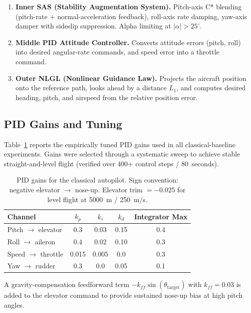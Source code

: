 \documentclass{article}
\begin{document}
\begin{enumerate}
  \item \textbf{Inner SAS (Stability Augmentation System).}
        Pitch-axis C* blending (pitch-rate + normal-acceleration feedback),
        roll-axis rate damping, yaw-axis damper with sideslip suppression.
        Alpha limiting at $|\alpha| > 25^\circ$.

  \item \textbf{Middle PID Attitude Controller.}
        Converts attitude errors (pitch, roll) into desired angular-rate
        commands, and speed error into a throttle command.

  \item \textbf{Outer NLGL (Nonlinear Guidance Law).}
        Projects the aircraft position onto the reference path, looks ahead
        by a distance $L_1$, and computes desired heading, pitch, and
        airspeed from the relative position error.
\end{enumerate}

\subsection{PID Gains and Tuning}

Table~\ref{tab:pid-gains} reports the empirically tuned PID gains used
in all classical-baseline experiments.  Gains were selected through a
systematic sweep to achieve stable straight-and-level flight (verified
over 400+ control steps / 80~seconds).

\begin{table}[h]
  \centering
  \caption{PID gains for the classical autopilot.  Sign convention:
           negative elevator $\rightarrow$ nose-up.  Elevator trim
           $= -0.025$ for level flight at 5000~m / 250~m/s.}
  \label{tab:pid-gains}
  \begin{tabular}{lcccc}
    \toprule
    \textbf{Channel} & \textbf{$k_p$} & \textbf{$k_i$} & \textbf{$k_d$} & \textbf{Integrator Max} \\
    \midrule
    Pitch $\rightarrow$ elevator  & 0.3 & 0.03 & 0.15 & 0.4 \\
    Roll $\rightarrow$ aileron    & 0.4 & 0.02 & 0.10 & 0.3 \\
    Speed $\rightarrow$ throttle  & 0.015 & 0.005 & 0.0 & 0.3 \\
    Yaw $\rightarrow$ rudder      & 0.3 & 0.0 & 0.05 & 0.1 \\
    \bottomrule
  \end{tabular}
  \vspace{4pt}
  \footnotesize
  A gravity-compensation feedforward term $-k_{\!f\!f} \sin(\theta_{\mathrm{target}})$
  with $k_{\!f\!f} = 0.03$ is added to the elevator command to provide
  sustained nose-up bias at high pitch angles.
\end{table}
\end{document}
